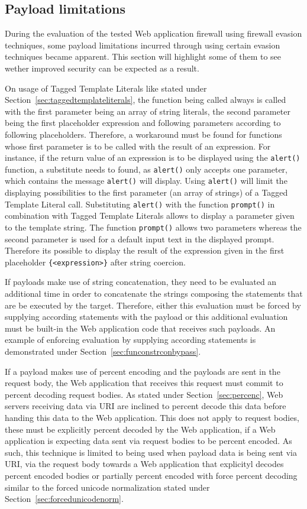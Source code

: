 \subsection{Payload limitations}
\label{sec:payloadlimitations}
During the evaluation of the tested Web application firewall using firewall evasion techniques, some payload limitations incurred through using certain evasion techniques became apparent. This section will highlight some of them to see wether improved security can be expected as a result. 

On usage of Tagged Template Literals like stated under Section~\ref{sec:taggedtemplateliterals}, the function being called always is called with the first parameter being an array of string literals, the second parameter being the first placeholder expression and following parameters according to following placeholders. Therefore, a workaround must be found for functions whose first parameter is to be called with the result of an expression.
For instance, if the return value of an expression is to be displayed using the \verb|alert()| function, a substitute needs to found, as \verb|alert()| only accepts one parameter, which contains the message \verb|alert()| will display. \cite{js/alert} 
Using \verb|alert()| will limit the displaying possibilities to the first parameter (an array of strings) of a Tagged Template Literal call. Substituting \verb|alert()| with the function \verb|prompt()| in combination with Tagged Template Literals allows to display a parameter given to the template string. The function \verb|prompt()| allows two parameters whereas the second parameter is used for a default input text in the displayed prompt. \cite{js/prompt} 
Therefore its possible to display the result of the expression given in the first placeholder {\verb|{<expression>}|} after string coercion. 

If payloads make use of string concatenation, they need to be evaluated an additional time in order to concatenate the strings composing the statements that are be executed by the target. Therefore, either this evaluation must be forced by supplying according statements with the payload or this additional evaluation must be built-in the Web application code that receives such payloads. An example of enforcing evaluation by supplying according statements is demonstrated under Section~\ref{sec:funconstrconbypass}.

If a payload makes use of percent encoding and the payloads are sent in the request body, the Web application that receives this request must commit to percent decoding request bodies. As stated under Section~\ref{sec:percenc}, Web servers receiving data via URI are inclined to percent decode this data before handing this data to the Web application. This does not apply to request bodies, these must be explicitly percent decoded by the Web application, if a Web application is expecting data sent via request bodies to be percent encoded. As such, this technique is limited to being used when payload data is being sent via URI, via the request body towards a Web application that explicityl decodes percent encoded bodies or partially percent encoded with force percent decoding similar to the forced unicode normalization stated under Section~\ref{sec:forcedunicodenorm}.

